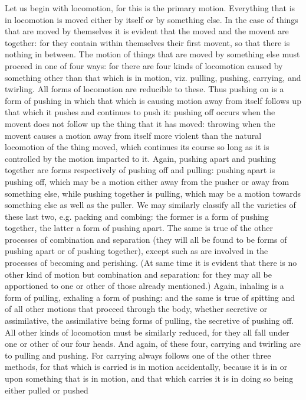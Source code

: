 Let us begin with locomotion, for this is the primary motion. Everything
that is in locomotion is moved either by itself or by something else.
In the case of things that are moved by themselves it is evident that
the moved and the movent are together: for they contain within themselves
their first movent, so that there is nothing in between. The motion
of things that are moved by something else must proceed in one of
four ways: for there are four kinds of locomotion caused by something
other than that which is in motion, viz. pulling, pushing, carrying,
and twirling. All forms of locomotion are reducible to these. Thus
pushing on is a form of pushing in which that which is causing motion
away from itself follows up that which it pushes and continues to
push it: pushing off occurs when the movent does not follow up the
thing that it has moved: throwing when the movent causes a motion
away from itself more violent than the natural locomotion of the thing
moved, which continues its course so long as it is controlled by the
motion imparted to it. Again, pushing apart and pushing together are
forms respectively of pushing off and pulling: pushing apart is pushing
off, which may be a motion either away from the pusher or away from
something else, while pushing together is pulling, which may be a
motion towards something else as well as the puller. We may similarly
classify all the varieties of these last two, e.g. packing and combing:
the former is a form of pushing together, the latter a form of pushing
apart. The same is true of the other processes of combination and
separation (they will all be found to be forms of pushing apart or
of pushing together), except such as are involved in the processes
of becoming and perishing. (At same time it is evident that there
is no other kind of motion but combination and separation: for they
may all be apportioned to one or other of those already mentioned.)
Again, inhaling is a form of pulling, exhaling a form of pushing:
and the same is true of spitting and of all other motions that proceed
through the body, whether secretive or assimilative, the assimilative
being forms of pulling, the secretive of pushing off. All other kinds
of locomotion must be similarly reduced, for they all fall under one
or other of our four heads. And again, of these four, carrying and
twirling are to pulling and pushing. For carrying always follows one
of the other three methods, for that which is carried is in motion
accidentally, because it is in or upon something that is in motion,
and that which carries it is in doing so being either pulled or pushed
